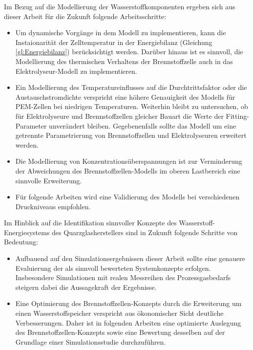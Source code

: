 Im Bezug auf die Modellierung der Wasserstoffkomponenten ergeben sich aus dieser Arbeit für die Zukunft folgende Arbeitsschritte:
\begin{itemize}
\item Um dynamische Vorgänge in dem Modell zu implementieren, kann die Instaionarität der Zelltemperatur in der Energiebilanz (Gleichung \ref{gl:Energiebilanz}) berücksichtigt werden. Darüber hinaus ist es sinnvoll, die Modellierung des thermischen Verhaltens der Brennstoffzelle auch in das Elektrolyseur-Modell zu implementieren.
\item Ein Modellierung des Temperatureinflusses auf die Durchtrittsfaktor oder die Austauschstromdichte verspricht eine höhere Genauigkeit des Modells für PEM-Zellen bei niedrigen Temperaturen. Weiterhin bleibt zu untersuchen, ob für Elektrolyseure und Brennstoffzellen gleicher Bauart die Werte der Fitting-Parameter unverändert bleiben. Gegebenenfalls sollte das Modell um eine getrennte Parametrierung von Brennstoffzellen und Elektrolyseuren erweitert werden.
\item Die Modellierung von Konzentrationsüberspannungen ist zur Verminderung der Abweichungen des Brennstoffzellen-Modells im oberen Lastbereich eine sinnvolle Erweiterung.
\item Für folgende Arbeiten wird eine Validierung des Modells bei verschiedenen Druckniveaus empfohlen.\\
\end{itemize}
Im Hinblick auf die Identifikation sinnvoller Konzepte des Wasserstoff-Energiesystems des Quarzglasherstellers sind in Zukunft folgende Schritte von Bedeutung:
\begin{itemize}
\item Aufbauend auf den Simulationsergebnissen dieser Arbeit sollte eine genauere Evaluierung der als sinnvoll bewerteten Systemkonzepte erfolgen. Insbesondere Simulationen mit realen Messreihen des Prozessgasbedarfs steigern dabei die Aussagekraft der Ergebnisse.
\item Eine Optimierung des Brennstoffzellen-Konzepts durch die Erweiterung um einen Wasserstoffspeicher verspricht aus ökonomischer Sicht deutliche Verbesserungen. Daher ist in folgenden Arbeiten eine optimierte Auslegung des Brennstoffzellen-Konzepts sowie eine Bewertung desselben auf der Grundlage einer Simulationsstudie durchzuführen.
\end{itemize}